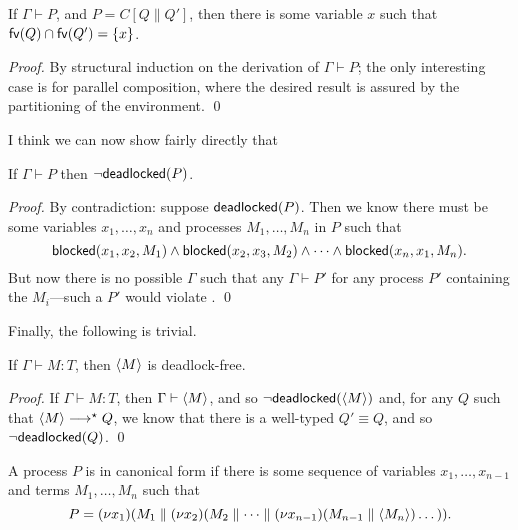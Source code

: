 \documentclass[orivec,envcountsame]{llncs}
\begin{document}
\begin{lemma}\label{thm:procs-share-one-channel}
  If $\Gamma \vdash P$, and $P = C[Q \parallel Q']$, then there is some variable $x$ such that
  $\mathsf{fv}(Q) \cap \mathsf{fv}(Q') = \{ x \}$.
\end{lemma}

\begin{proof}
  By structural induction on the derivation of $\Gamma \vdash P$; the only interesting case is for
  parallel composition, where the desired result is assured by the partitioning of the
  environment. \qed
\end{proof}

I think we can now show fairly directly that

\begin{lemma}\label{thm:typed-configs-df}
  If $\Gamma \vdash P$ then $\lnot \mathsf{deadlocked}(P)$.
\end{lemma}

\begin{proof}
  By contradiction: suppose $\mathsf{deadlocked}(P)$.  Then we know there must be some variables
  $x_1,\dots,x_n$ and processes $M_1,\dots,M_n$ in $P$ such that
  \[
    \mathsf{blocked}(x_1,x_2,M_1) \land \mathsf{blocked}(x_2,x_3,M_2) \land \cdots \land \mathsf{blocked}(x_n,x_1,M_n).
  \]
  But now there is no possible $\Gamma$ such that any $\Gamma \vdash P'$ for any process $P'$
  containing the $M_i$---such a $P'$ would violate .  \qed
\end{proof}

Finally, the following is trivial.

\begin{theorem}\label{thm:typed-terms-df}
  If $\Gamma \vdash M: T$, then $\langle M \rangle$ is deadlock-free.
\end{theorem}

\begin{proof}
  If $\Gamma \vdash M: T$, then $\Gamma \vdash \langle M \rangle$, and so
  $\lnot\mathsf{deadlocked}(\langle M \rangle)$ and, for any $Q$ such that $\langle M \rangle \longrightarrow^\star Q$, we
  know that there is a well-typed $Q' \equiv Q$, and so $\lnot\mathsf{deadlocked}(Q)$. \qed
\end{proof}

\begin{definition}
A process $P$ is in canonical form if there is some sequence of variables $x_1,\dots,x_{n-1}$ and
terms $M_1,\dots,M_n$ such that
\[
  P = (\nu x_1)(M_1 \parallel (\nu x_2)(M_2 \parallel \dots \parallel (\nu x_{n-1})(M_{n-1} \parallel \langle M_n \rangle)\dots)).
\]
\end{definition}
\end{document}

